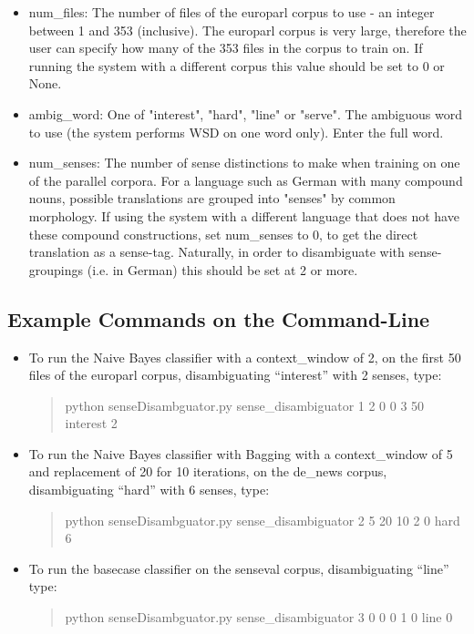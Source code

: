 \documentclass[a4wide,10pt]{article}
\begin{document}
\begin{itemize}
\item 
num\_files:     The number of files of the europarl corpus to use - an integer
                between 1 and 353 (inclusive). The europarl corpus is very
                large, therefore the user can specify how many of the 353
                files in the corpus to train on. If running the system with
                a different corpus this value should be set to 0 or None.

\item 
ambig\_word:    One of "interest", "hard", "line" or "serve". The ambiguous
                word to use (the system performs WSD on one word only).
                Enter the full word.

\item 
num\_senses:    The number of sense distinctions to make when training on one
                of the parallel corpora. For a language such as German
                with many compound nouns, possible translations are
                grouped into "senses" by common morphology. If using the
                system with a different language that does not have these
                compound constructions, set num\_senses to 0, to get the
                direct translation as a sense-tag. Naturally, in order to
                disambiguate with sense-groupings (i.e. in German) this
                should be set at 2 or more.

\end{itemize}

\subsection{Example Commands on the Command-Line}
\begin{itemize}

\item To run the Naive Bayes classifier with a context\_window of 2, on the 
first 50 files of the europarl corpus, disambiguating ``interest'' with 
2 senses, type: 
\begin{quote}
	python senseDisambguator.py sense\_disambiguator 1 2 0 0 3 50 interest 2
\end{quote}
\item To run the Naive Bayes classifier with Bagging with a context\_window 
of 5 and replacement of 20 for 10 iterations, on the de\_news corpus, 
disambiguating ``hard'' with 6 senses, type: 
\begin{quote}
	python senseDisambguator.py sense\_disambiguator 2 5 20 10 2 0 hard 6
\end{quote}
\item To run the basecase classifier on the senseval corpus, disambiguating 
``line'' type: 
\begin{quote}
	python senseDisambguator.py sense\_disambiguator 3 0 0 0 1 0 line 0
\end{quote}
\end{itemize}
\end{document}
